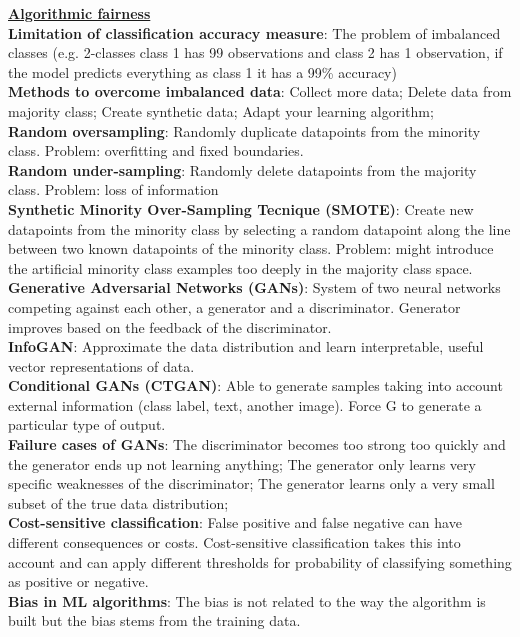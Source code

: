 \documentclass[a4paper,7pt,landscape]{extarticle}
\begin{document}
\begin{multicols}{3}
\begin{boxA}
\underline{\textbf{Algorithmic fairness}}\\
\textbf{Limitation of classification accuracy measure}: The problem of imbalanced classes (e.g. 2-classes class 1 has 99 observations and class 2 has 1 observation, if the model predicts everything as class 1 it has a 99\% accuracy)\\
\textbf{Methods to overcome imbalanced data}: Collect more data; Delete data from majority class; Create synthetic data; Adapt your learning algorithm;\\
\textbf{Random oversampling}: Randomly duplicate datapoints from the minority class. Problem: overfitting and fixed boundaries.\\
\textbf{Random under-sampling}: Randomly delete datapoints from the majority class. Problem: loss of information\\
\textbf{Synthetic Minority Over-Sampling Tecnique (SMOTE)}: Create new datapoints from the minority class by selecting a random datapoint along the line between two known datapoints of the minority class. Problem: might introduce the artificial minority class examples too deeply in the majority class space.\\
\textbf{Generative Adversarial Networks (GANs)}: System of two neural networks competing against each other, a generator and a discriminator. Generator improves based on the feedback of the discriminator.\\
\textbf{InfoGAN}: Approximate the data distribution and learn interpretable, useful vector representations of data.\\
\textbf{Conditional GANs (CTGAN)}: Able to generate samples taking into account external information (class label, text, another image). Force G to generate a particular type of output.\\
\textbf{Failure cases of GANs}: The discriminator becomes too strong too quickly and the generator ends up not learning anything; The generator only learns very specific weaknesses of the discriminator; The generator learns only a very small subset of the true data distribution;\\
\textbf{Cost-sensitive classification}: False positive and false negative can have different consequences or costs. Cost-sensitive classification takes this into account and can apply different thresholds for probability of classifying something as positive or negative.\\
\textbf{Bias in ML algorithms}: The bias is not related to the way the algorithm is built but the bias stems from the training data.\\

\end{boxA}
\end{multicols}
\end{document}
